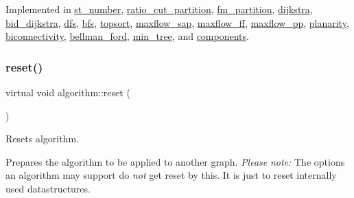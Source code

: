 Implemented in \mbox{\hyperlink{classst__number_a2aad4550b821c52d6998bff35fd8648f}{st\+\_\+number}}, \mbox{\hyperlink{classratio__cut__partition_a469c613c69db19cb63e492075346fea2}{ratio\+\_\+cut\+\_\+partition}}, \mbox{\hyperlink{classfm__partition_af72a9fcc300ab0f202168c819b089e5d}{fm\+\_\+partition}}, \mbox{\hyperlink{classdijkstra_a51ff4657e0ddb1ca5231a21e6dea1808}{dijkstra}}, \mbox{\hyperlink{classbid__dijkstra_a504aa04d114f27f2f886ee3b025ad95b}{bid\+\_\+dijkstra}}, \mbox{\hyperlink{classdfs_a1af70060897529e67910f589b047e576}{dfs}}, \mbox{\hyperlink{classbfs_a6dd7e852f7768814aafba8962befca56}{bfs}}, \mbox{\hyperlink{classtopsort_a777a9a68c4081d22e7b698ed3c515343}{topsort}}, \mbox{\hyperlink{classmaxflow__sap_aa2974bf25fb597677848fdb23c12d338}{maxflow\+\_\+sap}}, \mbox{\hyperlink{classmaxflow__ff_a4d0deee7d70bac4c9dad942341d87e37}{maxflow\+\_\+ff}}, \mbox{\hyperlink{classmaxflow__pp_a7ea24bd88999718e5e4e28ac028131cd}{maxflow\+\_\+pp}}, \mbox{\hyperlink{classplanarity_ae06c471d957a116aad14e338c341f8b1}{planarity}}, \mbox{\hyperlink{classbiconnectivity_a65e0e821f5e9ce8d210648d462fd2cfa}{biconnectivity}}, \mbox{\hyperlink{classbellman__ford_a9da2fb7d20ef1f726ee935474302d80b}{bellman\+\_\+ford}}, \mbox{\hyperlink{classmin__tree_ad87b1bfbc687ad943c07538fa0c3d270}{min\+\_\+tree}}, and \mbox{\hyperlink{classcomponents_aeeda901d02c65d6c31c8b6148540d7c1}{components}}.

\mbox{\label{classalgorithm_a21aba63d066ae7897de6ca7d8425c408}} 
\subsubsection{\texorpdfstring{reset()}{reset()}}
{\footnotesize\ttfamily virtual void algorithm\+::reset (\begin{DoxyParamCaption}{ }\end{DoxyParamCaption})\hspace{0.3cm}{\ttfamily [pure virtual]}}



Resets algorithm. 

Prepares the algorithm to be applied to another graph. {\itshape Please} {\itshape note\+:} The options an algorithm may support do {\itshape not} get reset by this. It is just to reset internally used datastructures. 

